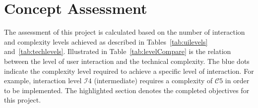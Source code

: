\chapter{Concept Assessment}\label{cha:assessment}

    The assessment of this project is calculated based on the number of interaction and complexity levels achieved as described in Tables~\ref{tab:uilevels} and~\ref{tab:techlevels}. Illustrated in Table~\ref{tab:levelCompare} is the relation between the level of user interaction and the technical complexity. The blue dots indicate the complexity level required to achieve a specific level of interaction. For example, interaction level $\mathcal{I}4$ (intermediate) requires a complexity of $\mathcal{C}5$ in order to be implemented. The highlighted section denotes the completed objectives for this project.

    \newcommand{\bmark}{\hskip 0.5em $\color{igmrBlue}\bullet$ \hskip 0.5em}
    \newcommand{\nomark}{\hskip 0.5em $\color{shade30}\circ$ \hskip 0.5em}
    \newcommand{\cshade}{\cellcolor{shade10}}

